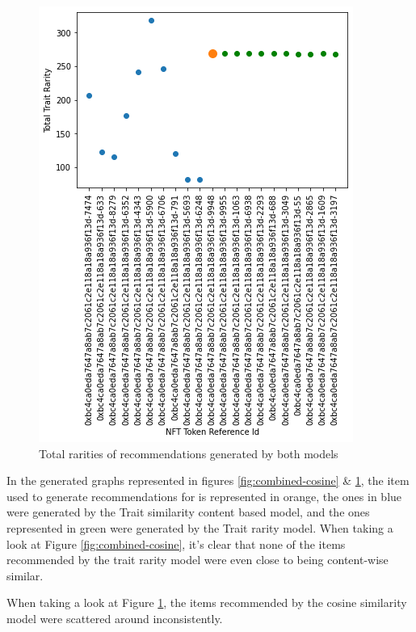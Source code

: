 \documentclass[conference]{IEEEtran}
\begin{document}
\begin{figure}[htbp]
\centerline{\includegraphics[width=\linewidth]{images/Total_rarities_content+rarity_based.png}}
\caption{Total rarities of recommendations generated by both models}
\label{fig:combined-rarity}
\end{figure}


In the generated graphs represented in figures \ref{fig:combined-cosine} \& \ref{fig:combined-rarity}, the item used to generate recommendations for is represented in orange, the ones in blue were generated by the Trait similarity content based model, and the ones represented in green were generated by the Trait rarity model.
When taking a look at Figure \ref{fig:combined-cosine}, it's clear that none of the items recommended by the trait rarity model were even close to being content-wise similar.

When taking a look at Figure \ref{fig:combined-rarity}, the items recommended by the cosine similarity model were scattered around inconsistently.
\end{document}
